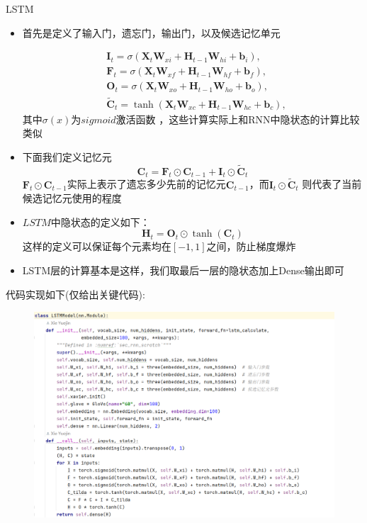 \documentclass[UTF8]{ctexbeamer}
\begin{document}
\begin{frame}[allowframebreaks]{LSTM}
\begin{itemize}
	\item 首先是定义了输入门，遗忘门，输出门，以及候选记忆单元
	
	\begin{align*}
		&\mathbf{I}_{t} =\sigma(\mathbf{X}_t\mathbf{W}_{xi}+\mathbf{H}_{t-1}\mathbf{W}_{hi}+\mathbf{b}_i), \\
		&\mathbf{F}_{t} =\sigma(\mathbf{X}_t\mathbf{W}_{xf}+\mathbf{H}_{t-1}\mathbf{W}_{hf}+\mathbf{b}_f), \\
		&\mathbf{O}_{t} =\sigma(\mathbf{X}_t\mathbf{W}_{xo}+\mathbf{H}_{t-1}\mathbf{W}_{ho}+\mathbf{b}_o),\\
		&\tilde{\mathbf{C}}_t=\tanh(\mathbf{X}_t\mathbf{W}_{xc}+\mathbf{H}_{t-1}\mathbf{W}_{hc}+\mathbf{b}_c),
	\end{align*}
	其中$\sigma(x)$为$sigmoid$激活函数 ，这些计算实际上和RNN中隐状态的计算比较类似\\
	\item 下面我们定义记忆元
	$$
	\mathbf{C}_t=\mathbf{F}_t\odot\mathbf{C}_{t-1}+\mathbf{I}_t\odot\tilde{\mathbf{C}}_t
	$$
	$\mathbf{F}_t\odot\mathbf{C}_{t-1}$实际上表示了遗忘多少先前的记忆元$\mathbf{C}_{t-1}$，而$\mathbf{I}_t\odot\tilde{\mathbf{C}}_t$ 则代表了当前候选记忆元使用的程度
	\item $LSTM$中隐状态的定义如下：
	$$
	\mathbf{H}_t=\mathbf{O}_t\odot\tanh(\mathbf{C}_t)
	$$
	这样的定义可以保证每个元素均在$[-1,1]$之间，防止梯度爆炸
	\item LSTM层的计算基本是这样，我们取最后一层的隐状态加上Dense输出即可
\end{itemize}\newpage
代码实现如下(仅给出关键代码):
\begin{figure}[H] %
	\centering %
	\includegraphics[scale=0.25]{LSTM2.png} %

\end{figure}
\end{frame}
\end{document}

